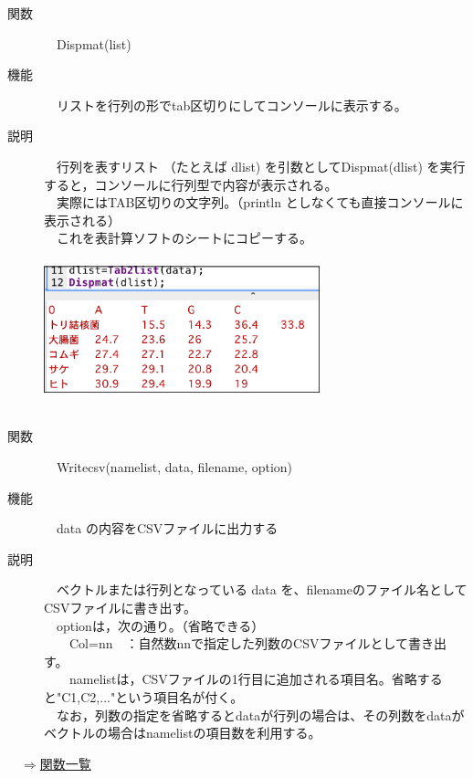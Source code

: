 \documentclass[papersize,a4paper,12pt,uplatex]{jsarticle}
\begin{document}
\begin{description}
\hypertarget{dispmat}{}
\item[関数]　Dispmat(list)
\item[機能]　リストを行列の形でtab区切りにしてコンソールに表示する。
\item[説明]　行列を表すリスト （たとえば dlist) を引数としてDispmat(dlist) を実行すると，コンソールに行列型で内容が表示される。\\
　実際にはTAB区切りの文字列。（println としなくても直接コンソールに表示される）\\
　これを表計算ソフトのシートにコピーする。\\
　\\
\includegraphics[bb=0 0 855 395 , width=8cm]{Fig/tab2list04.png}\\
\\

\hypertarget{writecsv}{}
\item[関数]　Writecsv(namelist, data, filename, option)
\item[機能]　data の内容をCSVファイルに出力する
\item[説明]　ベクトルまたは行列となっている data を、filenameのファイル名としてCSVファイルに書き出す。\\
　optionは，次の通り。（省略できる）\\
　　Col=nn　：自然数nnで指定した列数のCSVファイルとして書き出す。\\
　　namelistは，CSVファイルの1行目に追加される項目名。省略すると"C1,C2,..."という項目名が付く。\\
 
 　なお，列数の指定を省略するとdataが行列の場合は、その列数をdataがベクトルの場合はnamelistの項目数を利用する。

\end{description}

\begin{flushright}　\hyperlink{functionlist}{$\Rightarrow$関数一覧}\end{flushright}

\newpage
\end{document}
